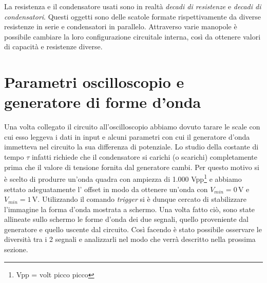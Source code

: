 La resistenza e il condensatore usati sono in realtà \textit{decadi di resistenze} e \textit{decadi di condensatori}. Questi oggetti sono delle scatole formate rispettivamente da diverse resistenze in serie e condensatori in parallelo. Attraverso varie manopole è possibile cambiare la loro configurazione circuitale interna, così da ottenere valori di capacità e resistenze diverse. 

\section{Parametri oscilloscopio e generatore di forme d'onda}

Una volta collegato il circuito all'oscilloscopio abbiamo dovuto tarare le scale con cui esso leggeva i dati in input e alcuni parametri con cui il generatore d'onda immetteva nel circuito la sua differenza di potenziale. Lo studio della costante di tempo $\tau$ infatti richiede che il condensatore si carichi (o scarichi) completamente prima che il valore di tensione fornita dal generatore cambi. Per questo motivo si è scelto di produrre un'onda quadra con ampiezza di 1.000 Vpp\footnote{Vpp = volt picco picco} e abbiamo settato adeguatamente l' offset %
in modo da ottenere un'onda con $V_{min}=0\,\si{\volt}$ e $V_{min}=1\,\si{\volt}$. Utilizzando il comando \textit{trigger} si è dunque cercato di stabilizzare l'immagine la forma d'onda mostrata a schermo. Una volta fatto ciò, sono state allineate sullo schermo le forme d'onda dei due segnali, quello proveniente dal generatore e quello uscente dal circuito. Così facendo è stato possibile osservare le diversità tra i 2 segnali e analizzarli nel modo che verrà descritto nella prossima sezione.
 